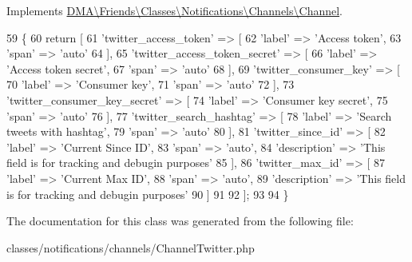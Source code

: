 Implements \hyperlink{interfaceDMA_1_1Friends_1_1Classes_1_1Notifications_1_1Channels_1_1Channel_aa473115fa58a6fa5f57a9069f23dd771}{D\-M\-A\textbackslash{}\-Friends\textbackslash{}\-Classes\textbackslash{}\-Notifications\textbackslash{}\-Channels\textbackslash{}\-Channel}.


\begin{DoxyCode}
59     \{
60         \textcolor{keywordflow}{return} [
61             \textcolor{stringliteral}{'twitter\_access\_token'} => [
62                 \textcolor{stringliteral}{'label'} => \textcolor{stringliteral}{'Access token'},
63                 \textcolor{stringliteral}{'span'}  => \textcolor{stringliteral}{'auto'}
64             ],
65             \textcolor{stringliteral}{'twitter\_access\_token\_secret'} => [
66                 \textcolor{stringliteral}{'label'} => \textcolor{stringliteral}{'Access token secret'},
67                 \textcolor{stringliteral}{'span'}  => \textcolor{stringliteral}{'auto'}
68             ],
69             \textcolor{stringliteral}{'twitter\_consumer\_key'} => [
70                 \textcolor{stringliteral}{'label'} => \textcolor{stringliteral}{'Consumer key'},
71                 \textcolor{stringliteral}{'span'}  => \textcolor{stringliteral}{'auto'}
72             ],
73             \textcolor{stringliteral}{'twitter\_consumer\_key\_secret'} => [
74                 \textcolor{stringliteral}{'label'} => \textcolor{stringliteral}{'Consumer key secret'},
75                 \textcolor{stringliteral}{'span'}  => \textcolor{stringliteral}{'auto'}
76             ],
77             \textcolor{stringliteral}{'twitter\_search\_hashtag'} => [
78                 \textcolor{stringliteral}{'label'} => \textcolor{stringliteral}{'Search tweets with hashtag'},
79                 \textcolor{stringliteral}{'span'}  => \textcolor{stringliteral}{'auto'}
80             ],
81             \textcolor{stringliteral}{'twitter\_since\_id'} => [
82                 \textcolor{stringliteral}{'label'} => \textcolor{stringliteral}{'Current Since ID'},
83                 \textcolor{stringliteral}{'span'}  => \textcolor{stringliteral}{'auto'},
84                 \textcolor{stringliteral}{'description'} => \textcolor{stringliteral}{'This field is for tracking and debugin purposes'}
85             ],
86             \textcolor{stringliteral}{'twitter\_max\_id'} => [
87                 \textcolor{stringliteral}{'label'} => \textcolor{stringliteral}{'Current Max ID'},
88                 \textcolor{stringliteral}{'span'}  => \textcolor{stringliteral}{'auto'},
89                 \textcolor{stringliteral}{'description'} => \textcolor{stringliteral}{'This field is for tracking and debugin purposes'}
90             ]
91 
92         ];
93 
94     \}
\end{DoxyCode}


The documentation for this class was generated from the following file\-:\begin{DoxyCompactItemize}
\item 
classes/notifications/channels/Channel\-Twitter.\-php\end{DoxyCompactItemize}
